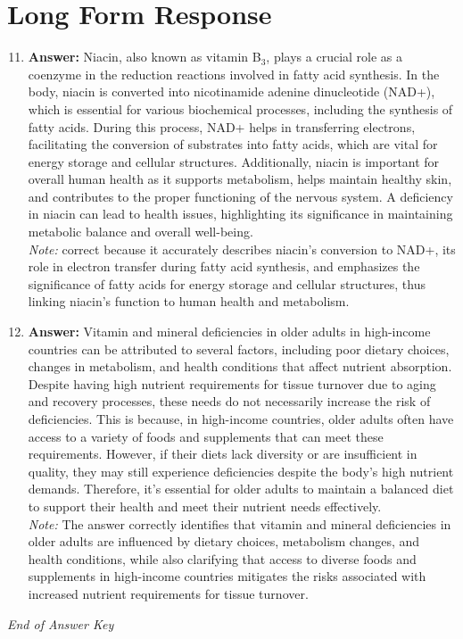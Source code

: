\documentclass[12pt]{article}
\begin{document}
\section*{Long Form Response}
\begin{enumerate}[label=\arabic*.]
\setcounter{enumi}{10}
\item \textbf{Answer:} Niacin, also known as vitamin B$_{3}$, plays a crucial role as a coenzyme in the reduction reactions involved in fatty acid synthesis. In the body, niacin is converted into nicotinamide adenine dinucleotide (NAD+), which is essential for various biochemical processes, including the synthesis of fatty acids. During this process, NAD+ helps in transferring electrons, facilitating the conversion of substrates into fatty acids, which are vital for energy storage and cellular structures. Additionally, niacin is important for overall human health as it supports metabolism, helps maintain healthy skin, and contributes to the proper functioning of the nervous system. A deficiency in niacin can lead to health issues, highlighting its significance in maintaining metabolic balance and overall well-being.
\\ \textit{Note:} correct because it accurately describes niacin's conversion to NAD+, its role in electron transfer during fatty acid synthesis, and emphasizes the significance of fatty acids for energy storage and cellular structures, thus linking niacin's function to human health and metabolism.
\item \textbf{Answer:} Vitamin and mineral deficiencies in older adults in high-income countries can be attributed to several factors, including poor dietary choices, changes in metabolism, and health conditions that affect nutrient absorption. Despite having high nutrient requirements for tissue turnover due to aging and recovery processes, these needs do not necessarily increase the risk of deficiencies. This is because, in high-income countries, older adults often have access to a variety of foods and supplements that can meet these requirements. However, if their diets lack diversity or are insufficient in quality, they may still experience deficiencies despite the body's high nutrient demands. Therefore, it's essential for older adults to maintain a balanced diet to support their health and meet their nutrient needs effectively.
\\ \textit{Note:} The answer correctly identifies that vitamin and mineral deficiencies in older adults are influenced by dietary choices, metabolism changes, and health conditions, while also clarifying that access to diverse foods and supplements in high-income countries mitigates the risks associated with increased nutrient requirements for tissue turnover.
\end{enumerate}

\vfill
\noindent\textit{End of Answer Key}
\end{document}
